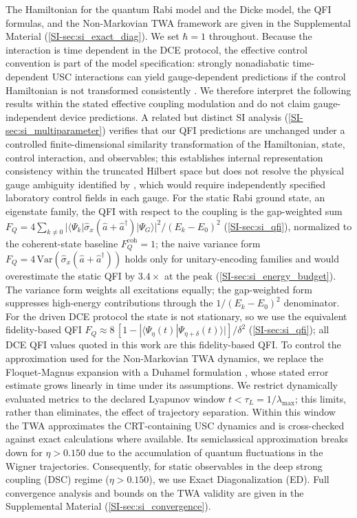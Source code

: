 \documentclass[aps,prxquantum,preprint,superscriptaddress,amsmath,amssymb]{revtex4-2}
\begin{document}
The Hamiltonian for the quantum Rabi model and the Dicke model, the QFI formulas, and the Non-Markovian TWA framework \cite{Polkovnikov2010} are given in the Supplemental Material (\cref{SI-sec:si_exact_diag}). We set $\hbar = 1$ throughout. Because the interaction is time dependent in the DCE protocol, the effective control convention is part of the model specification: strongly nonadiabatic time-dependent USC interactions can yield gauge-dependent predictions if the control Hamiltonian is not transformed consistently \cite{Stokes2021}. We therefore interpret the following results within the stated effective coupling modulation and do not claim gauge-independent device predictions. A related but distinct SI analysis (\cref{SI-sec:si_multiparameter}) verifies that our QFI predictions are unchanged under a controlled finite-dimensional similarity transformation of the Hamiltonian, state, control interaction, and observables; this establishes internal representation consistency within the truncated Hilbert space but does not resolve the physical gauge ambiguity identified by \cite{Stokes2021}, which would require independently specified laboratory control fields in each gauge. For the static Rabi ground state, an eigenstate family, the QFI with respect to the coupling is the gap-weighted sum $F_Q = 4\sum_{k\neq0}|\langle\Psi_k|\hat{\sigma}_x(\hat{a}+\hat{a}^\dagger)|\Psi_G\rangle|^2/(E_k-E_0)^2$ (\cref{SI-sec:si_qfi}), normalized to the coherent-state baseline $F_Q^{\text{coh}} = \num{1}$; the naive variance form $F_Q = \num{4}\,\text{Var}(\hat{\sigma}_x(\hat{a}+\hat{a}^\dagger))$ holds only for unitary-encoding families and would overestimate the static QFI by $\num{3.4}\times$ at the peak (\cref{SI-sec:si_energy_budget}). The variance form weights all excitations equally; the gap-weighted form suppresses high-energy contributions through the $1/(E_k-E_0)^2$ denominator. For the driven DCE protocol the state is not stationary, so we use the equivalent fidelity-based QFI $F_Q \approx \num{8}\,[1-|\langle\Psi_\eta(t)|\Psi_{\eta+\delta}(t)\rangle|]/\delta^2$ (\cref{SI-sec:si_qfi}); all DCE QFI values quoted in this work are this fidelity-based QFI. To control the approximation used for the Non-Markovian TWA dynamics, we replace the Floquet-Magnus expansion with a Duhamel formulation \cite{Larson2024}, whose stated error estimate grows linearly in time under its assumptions. We restrict dynamically evaluated metrics to the declared Lyapunov window $t < \tau_L = 1/\lambda_{\max}$; this limits, rather than eliminates, the effect of trajectory separation. Within this window the TWA approximates the CRT-containing USC dynamics and is cross-checked against exact calculations where available. Its semiclassical approximation breaks down for $\eta > \num{0.150}$ due to the accumulation of quantum fluctuations in the Wigner trajectories. Consequently, for static observables in the deep strong coupling (DSC) regime ($\eta > \num{0.150}$), we use Exact Diagonalization (ED). Full convergence analysis and bounds on the TWA validity are given in the Supplemental Material (\cref{SI-sec:si_convergence}).
\end{document}
